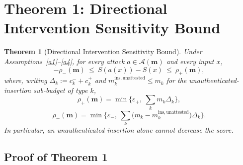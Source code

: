 \documentclass[11pt]{article}
\theoremstyle{plain}
\newtheorem{theorem}{Theorem}
\theoremstyle{definition}
\begin{document}
\section{Theorem 1: Directional Intervention Sensitivity Bound}

\begin{theorem}[Directional Intervention Sensitivity Bound]\label{thm:1}
Under Assumptions~\ref{a1}--\ref{a4}, for every attack $a \in \mathcal A(\mathbf m)$ and every input $x$,
\[
- \rho_-(\mathbf m) \ \le\ S(a(x)) - S(x) \ \le\ \rho_+(\mathbf m),
\]
where, writing $\Delta_k := c_k^- + c_k^+$ and $m_k^{\mathrm{ins,unattested}} \le m_k$ for the
unauthenticated-insertion sub-budget of type $k$,
\[
\rho_+(\mathbf m) = \min\!\Big\{\varepsilon_+,\ \sum_k m_k \Delta_k\Big\},
\]
\[
\rho_-(\mathbf m) = \min\!\Big\{\varepsilon_-,\ \sum_k \big(m_k - m_k^{\mathrm{ins,unattested}}\big)\Delta_k\Big\}.
\]
In particular, an unauthenticated insertion alone cannot decrease the score.
\end{theorem}

\subsection{Proof of Theorem 1}
\end{document}
